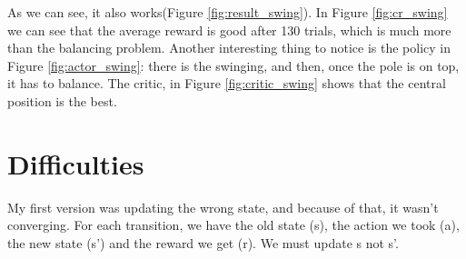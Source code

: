 \documentclass{article}
\begin{document}
As we can see, it also works(Figure \ref{fig:result_swing}). In Figure \ref{fig:cr_swing} we can see that the average reward is good after 130 trials, which is much more than the balancing problem. Another interesting thing to notice is the policy in Figure \ref{fig:actor_swing}: there is the swinging, and then, once the pole is on top, it has to balance. The critic, in Figure \ref{fig:critic_swing} shows that the central position is the best.



\section{Difficulties}
My first version was updating the wrong state, and because of that, it wasn't converging. For each transition, we have the old state (s), the action we took (a), the new state (s') and the reward we get (r). We must update s not s'.





\end{document}
